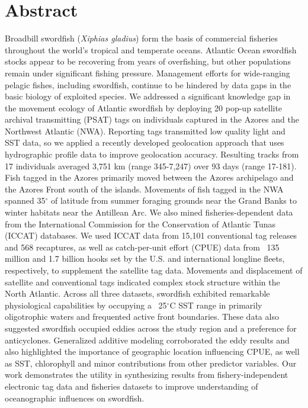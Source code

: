 \clearpage

\section{Abstract} 

Broadbill swordfish (\textit{Xiphias gladius}) form the basis of commercial fisheries throughout the world's tropical and temperate oceans. Atlantic Ocean swordfish stocks appear to be recovering from years of overfishing, but other populations remain under significant fishing pressure. Management efforts for wide-ranging pelagic fishes, including swordfish, continue to be hindered by data gaps in the basic biology of exploited species. We addressed a significant knowledge gap in the movement ecology of Atlantic swordfish by deploying 20 pop-up satellite archival transmitting (PSAT) tags on individuals captured in the Azores and the Northwest Atlantic (NWA). Reporting tags transmitted low quality light and SST data, so we applied a recently developed geolocation approach that uses hydrographic profile data to improve geolocation accuracy. Resulting tracks from 17 individuals averaged 3,751 km (range 345-7,247) over 93 days (range 17-181). Fish tagged in the Azores primarily moved between the Azores archipelago and the Azores Front south of the islands. Movements of fish tagged in the NWA spanned 35$^\circ$ of latitude from summer foraging grounds near the Grand Banks to winter habitats near the Antillean Arc. We also mined fisheries-dependent data from the International Commission for the Conservation of Atlantic Tunas (ICCAT) databases. We used ICCAT data from 15,101 conventional tag releases and 568 recaptures, as well as catch-per-unit effort (CPUE) data from ~135 million and 1.7 billion hooks set by the U.S. and international longline fleets, respectively, to supplement the satellite tag data. Movements and displacement of satellite and conventional tags indicated complex stock structure within the North Atlantic. Across all three datasets, swordfish exhibited remarkable physiological capabilities by occupying a ~25$^\circ$C SST range in primarily oligotrophic waters and frequented active front boundaries. These data also suggested swordfish occupied eddies across the study region and a preference for anticyclones. Generalized additive modeling corroborated the eddy results and also highlighted the importance of geographic location influencing CPUE, as well as SST, chlorophyll and minor contributions from other predictor variables. Our work demonstrates the utility in synthesizing results from fishery-independent electronic tag data and fisheries datasets to improve understanding of oceanographic influences on swordfish.

